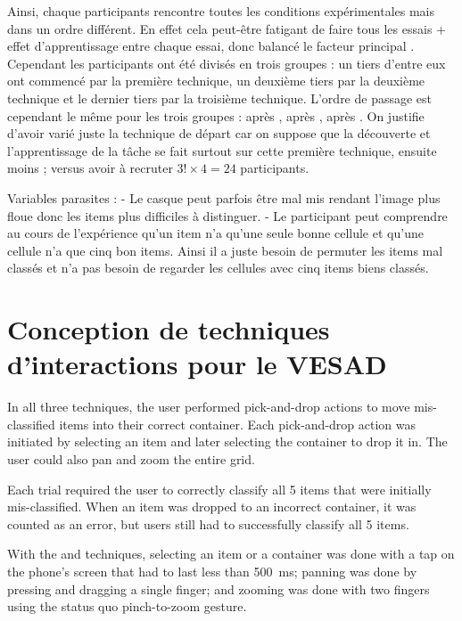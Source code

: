 Ainsi, chaque participants rencontre toutes les conditions expérimentales mais dans un ordre différent. En effet cela peut-être fatigant de faire tous les essais + effet d'apprentissage entre chaque essai, donc balancé le facteur principal . Cependant les participants ont été divisés en trois groupes : un tiers d'entre eux ont commencé par la première technique, un deuxième tiers par la deuxième technique et le dernier tiers par la troisième technique. L'ordre de passage est cependant le même pour les trois groupes :  après ,  après ,  après . On justifie d'avoir varié juste la technique de départ car on suppose que la découverte et l'apprentissage de la tâche se fait surtout sur cette première technique, ensuite moins ; versus avoir à recruter $3! \times 4 = 24$ participants.

Variables parasites : 
- Le casque peut parfois être mal mis rendant l'image plus floue donc les items plus difficiles à distinguer.
- Le participant peut comprendre au cours de l'expérience qu'un item n'a qu'une seule bonne cellule et qu'une cellule n'a que cinq bon items. Ainsi il a juste besoin de permuter les items mal classés et n'a pas besoin de regarder les cellules avec cinq items biens classés.


\section{Conception de techniques d'interactions pour le VESAD}
\label{sec:experiment_interactions}

In all three techniques, the user performed pick-and-drop actions to move mis-classified items into their correct container. Each pick-and-drop action was initiated by selecting an item and later selecting the container to drop it in. The user could also pan and zoom the entire grid.

Each trial required the user to correctly classify all 5 items that were initially mis-classified. When an item was dropped to an incorrect container, it was counted as an error, but users still had to successfully classify all 5 items.

With the  and  techniques, selecting an item or a container was done with a tap on the phone's screen that had to last less than \SI{500}{\ms}; panning was done by pressing and dragging a single finger; and zooming was done with two fingers using the status quo pinch-to-zoom gesture.

